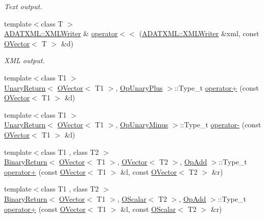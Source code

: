 \begin{DoxyCompactItemize}
\begin{DoxyCompactList}\small\item\em Text output. \end{DoxyCompactList}\item 
{\footnotesize template$<$class T $>$ }\\\mbox{\hyperlink{classADATXML_1_1XMLWriter}{A\+D\+A\+T\+X\+M\+L\+::\+X\+M\+L\+Writer}} \& \mbox{\hyperlink{group__obsvector_ga21a786931a7efb82964106799b422557}{operator$<$$<$}} (\mbox{\hyperlink{classADATXML_1_1XMLWriter}{A\+D\+A\+T\+X\+M\+L\+::\+X\+M\+L\+Writer}} \&xml, const \mbox{\hyperlink{classENSEM_1_1OVector}{O\+Vector}}$<$ T $>$ \&d)
\begin{DoxyCompactList}\small\item\em X\+ML output. \end{DoxyCompactList}\item 
{\footnotesize template$<$class T1 $>$ }\\\mbox{\hyperlink{structENSEM_1_1UnaryReturn}{Unary\+Return}}$<$ \mbox{\hyperlink{classENSEM_1_1OVector}{O\+Vector}}$<$ T1 $>$, \mbox{\hyperlink{structENSEM_1_1OpUnaryPlus}{Op\+Unary\+Plus}} $>$\+::Type\+\_\+t \mbox{\hyperlink{group__obsvector_gac2f83a4dfd7def38a8b25cf6a1e32c7c}{operator+}} (const \mbox{\hyperlink{classENSEM_1_1OVector}{O\+Vector}}$<$ T1 $>$ \&l)
\item 
{\footnotesize template$<$class T1 $>$ }\\\mbox{\hyperlink{structENSEM_1_1UnaryReturn}{Unary\+Return}}$<$ \mbox{\hyperlink{classENSEM_1_1OVector}{O\+Vector}}$<$ T1 $>$, \mbox{\hyperlink{structENSEM_1_1OpUnaryMinus}{Op\+Unary\+Minus}} $>$\+::Type\+\_\+t \mbox{\hyperlink{group__obsvector_ga914cf43b5cebf3dc6244c6f4f82435be}{operator-\/}} (const \mbox{\hyperlink{classENSEM_1_1OVector}{O\+Vector}}$<$ T1 $>$ \&l)
\item 
{\footnotesize template$<$class T1 , class T2 $>$ }\\\mbox{\hyperlink{structENSEM_1_1BinaryReturn}{Binary\+Return}}$<$ \mbox{\hyperlink{classENSEM_1_1OVector}{O\+Vector}}$<$ T1 $>$, \mbox{\hyperlink{classENSEM_1_1OVector}{O\+Vector}}$<$ T2 $>$, \mbox{\hyperlink{structENSEM_1_1OpAdd}{Op\+Add}} $>$\+::Type\+\_\+t \mbox{\hyperlink{group__obsvector_gab0356c94496b2d6ffd11e6e595df0ea8}{operator+}} (const \mbox{\hyperlink{classENSEM_1_1OVector}{O\+Vector}}$<$ T1 $>$ \&l, const \mbox{\hyperlink{classENSEM_1_1OVector}{O\+Vector}}$<$ T2 $>$ \&r)
\item 
{\footnotesize template$<$class T1 , class T2 $>$ }\\\mbox{\hyperlink{structENSEM_1_1BinaryReturn}{Binary\+Return}}$<$ \mbox{\hyperlink{classENSEM_1_1OVector}{O\+Vector}}$<$ T1 $>$, \mbox{\hyperlink{classENSEM_1_1OScalar}{O\+Scalar}}$<$ T2 $>$, \mbox{\hyperlink{structENSEM_1_1OpAdd}{Op\+Add}} $>$\+::Type\+\_\+t \mbox{\hyperlink{group__obsvector_gaff6b0407180422eb54c7c31f17d340e3}{operator+}} (const \mbox{\hyperlink{classENSEM_1_1OVector}{O\+Vector}}$<$ T1 $>$ \&l, const \mbox{\hyperlink{classENSEM_1_1OScalar}{O\+Scalar}}$<$ T2 $>$ \&r)

\end{DoxyCompactItemize}
